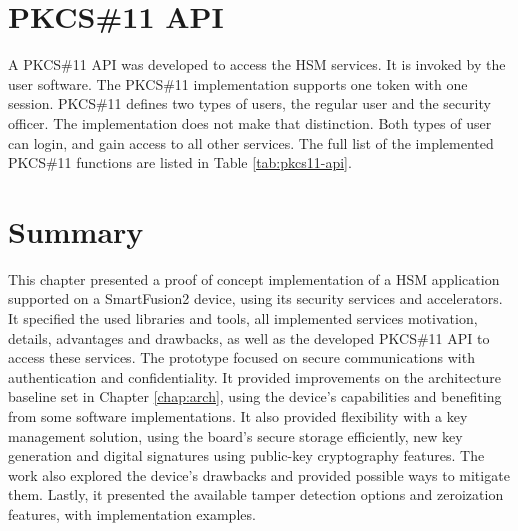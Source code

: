 \section{PKCS\#11 API}\label{chap:implementation:app:pkcs}

A PKCS\#11 API was developed to access the HSM services. It is invoked by the user software.
The PKCS\#11 implementation supports one token with one session.
PKCS\#11 defines two types of users, the regular user and the security officer. The implementation does not make that distinction. Both types of user can login, and gain access to all other services.
The full list of the implemented PKCS\#11 functions are listed in Table \ref{tab:pkcs11-api}.

\section*{Summary}\label{chap:implementation:summary}

This chapter presented a proof of concept implementation of a HSM application supported on a SmartFusion2 device, using its security services and accelerators. It specified the used libraries and tools, all implemented services motivation, details, advantages and drawbacks,  as well as the developed PKCS\#11 API to access these services. The prototype focused on secure communications with authentication and confidentiality. It provided improvements on the architecture baseline set in Chapter \ref{chap:arch}, using the device's capabilities and benefiting from some software implementations. It also provided flexibility with a key management solution, using the board's secure storage efficiently, new key generation and digital signatures using public-key cryptography features.
The work also explored the device's drawbacks and provided possible ways to mitigate them. Lastly, it presented the available tamper detection options and zeroization features, with implementation examples.

